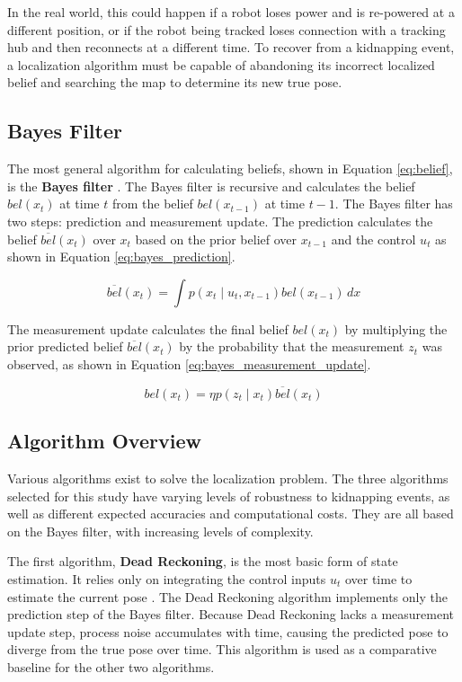 In the real world, this could happen if a robot loses power and is re-powered at a different position, or if the robot being tracked loses connection with a tracking hub and then reconnects at a different time.
To recover from a kidnapping event, a localization algorithm must be capable of abandoning its incorrect localized belief and searching the map to determine its new true pose.

\subsection{Bayes Filter}
The most general algorithm for calculating beliefs, shown in Equation \ref{eq:belief}, is the \textbf{Bayes filter} \cite{thrun2005probabilistic}.
The Bayes filter is recursive and calculates the belief $bel(x_t)$ at time $t$ from the belief $bel(x_{t-1})$ at time $t-1$.
The Bayes filter has two steps: prediction and measurement update.
The prediction calculates the belief $\overline{bel}(x_t)$ over $x_t$ based on the prior belief over $x_{t-1}$ and the control $u_t$ as shown in Equation \ref{eq:bayes_prediction}.

\begin{equation}\label{eq:bayes_prediction}
    \overline{bel}(x_t)=\int p(x_t \mid u_t, x_{t-1})bel(x_{t-1}) \,dx 
\end{equation}

The measurement update calculates the final belief $bel(x_t)$ by multiplying the prior predicted belief $\overline{bel}(x_t)$ by the probability that the measurement $z_t$ was observed, as shown in Equation \ref{eq:bayes_measurement_update}.

\begin{equation}\label{eq:bayes_measurement_update}
    bel(x_t)= \eta p(z_t \mid x_t) \overline{bel}(x_t) 
\end{equation}

\subsection{Algorithm Overview}
Various algorithms exist to solve the localization problem.
The three algorithms selected for this study have varying levels of robustness to kidnapping events, as well as different expected accuracies and computational costs.
They are all based on the Bayes filter, with increasing levels of complexity.

The first algorithm, \textbf{Dead Reckoning}, is the most basic form of state estimation.
It relies only on integrating the control inputs $u_t$ over time to estimate the current pose \cite{ros2_control_mobile_robot_kinematics}.
The Dead Reckoning algorithm implements only the prediction step of the Bayes filter.
Because Dead Reckoning lacks a measurement update step, process noise accumulates with time, causing the predicted pose to diverge from the true pose over time.
This algorithm is used as a comparative baseline for the other two algorithms.

